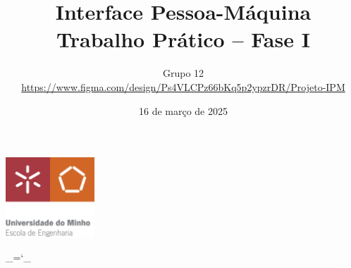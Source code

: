 \documentclass[12pt, a4paper]{article}
\title{\textbf{Interface Pessoa-Máquina \\ \large Trabalho Prático -- Fase I}}
\date{16 de março de 2025}
\author{Grupo 12 \\
    \url{https://www.figma.com/design/Ps4VLCPz66bKq5p2ypzrDR/Projeto-IPM}}
\begin{document}
\begin{center}
    \includegraphics[width=0.25\textwidth]{res/cover/school-of-engineering.eps}
\end{center}

{\let\newpage\relax\maketitle}
\maketitle
\thispagestyle{empty}

\chardef\_=`_
\onehalfspacing
\setlength{\parskip}{\baselineskip}
\setlength{\intextsep}{2\baselineskip}
\setlength\belowcaptionskip{-\baselineskip}
\setlength{\parindent}{0pt}
\def\arraystretch{1.5}
\end{document}
